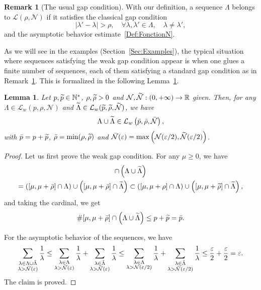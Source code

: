 \documentclass[10pt]{amsart}
\newtheorem{lemm}[theo]{Lemma}\newtheorem{prop}[theo]{Proposition}\newtheorem{coro}[theo]{Corollary}\newtheorem{conj}[theo]{Conjecture}
\theoremstyle{definition}\newtheorem{defi}[theo]{Definition}\newtheorem{rema}[theo]{Remark}\newtheorem{exam}[theo]{Example}\newtheorem{exem}[theo]{Example}\newtheorem{nota}[theo]{Notation}
\newcommand{\LL}{\mathcal{L}}
\newcommand{\NN}{\mathcal{N}}
\newcommand{\N}{\mathbb{N}}
\newcommand{\R}{\mathbb{R}}
\let\oldtilde\tilde
\renewcommand*{\tilde}[1]{\mathchoice{\widetilde{#1}}{\widetilde{#1}}{\oldtilde{#1}}{\oldtilde{#1}}}\let\oldexists\exists
\renewcommand*{\exists}{\mathrel{\oldexists}}
\let\oldforall\forall
\renewcommand*{\forall}{\mathrel{\oldforall}}
\begin{document}
\begin{rema}[The usual gap condition]\label{Rem:usual_gap}
With our definition, a sequence $\Lambda$ belongs to $\LL(\rho,\NN)$ if it satisfies the classical gap condition
\begin{equation}\label{FattoriniRussell_Gap}
|\lambda' - \lambda| > \rho, \quad \forall \lambda,\lambda'\in \Lambda, \quad \lambda\neq \lambda',
\end{equation}
and the asymptotic behavior estimate~\eqref{Def:FonctionN}.
\end{rema}

As we will see in the examples (Section~\ref{Sec:Examples}), the typical situation where sequences satisfying the weak gap condition appear is when one glues a finite number of sequences, each of them satisfying a standard gap condition as in Remark~\ref{Rem:usual_gap}. This is formalized in the following Lemma~\ref{Lem:Stabilite_Lw_Union}.


\begin{lemm}\label{Lem:Stabilite_Lw_Union}
Let $p,\tilde{p} \in \N^*$, $\rho,\tilde{\rho} > 0$ and $\NN,\tilde{\NN} : (0,+\infty) \to \R$ given. Then, for any $\Lambda\in \LL_w(p, \rho, \NN)$ and $\tilde{\Lambda}\in \LL_w(\tilde{p}, \tilde{\rho}, \tilde{\NN})$, we have
\[
\Lambda \cup \tilde{\Lambda} \in \LL_w\left(\bar{p}, \bar{\rho}, \bar{\NN}\right),
\]
with $\bar{p}=p+\tilde{p}$, $\bar{\rho}=\min(\rho,\tilde{\rho})$ and $\bar{\NN}(\varepsilon) = \max \left(\NN(\varepsilon/2),\tilde{\NN}(\varepsilon/2)\right)$.
\end{lemm}

\begin{proof}
Let us first prove the weak gap condition. For any $\mu\geq 0$, we have
\begin{multline*}
[\mu,\mu+\bar{\rho}] \cap \left(\Lambda\cup \tilde{\Lambda}\right)\\ = \left([\mu,\mu+\bar{\rho}] \cap \Lambda \right) \cup \left([\mu,\mu+\bar{\rho}]\cap \tilde{\Lambda}\right)
\subset \left([\mu,\mu+\rho] \cap \Lambda \right) \cup \left([\mu,\mu+\tilde{\rho}]\cap \tilde{\Lambda}\right),
\end{multline*}
and taking the cardinal, we get
\[
\# [\mu,\mu+\bar{\rho}] \cap \left(\Lambda\cup \tilde{\Lambda}\right) \leq p + \tilde{p}=\bar{p}.
\]

For the asymptotic behavior of the sequences, we have
\[
\sum_{\substack{\lambda \in \Lambda\cup \tilde{\Lambda} \\ \lambda>\bar{\NN}(\varepsilon)}} \frac{1}{\lambda}
\leq \sum_{\substack{\lambda \in \Lambda \\ \lambda>\bar{\NN}(\varepsilon)}} \frac{1}{\lambda} + \sum_{\substack{\lambda \in \tilde{\Lambda} \\ \lambda>\bar{\NN}(\varepsilon)}} \frac{1}{\lambda}
\leq \sum_{\substack{\lambda \in \Lambda \\ \lambda>{\NN}(\varepsilon/2)}} \frac{1}{\lambda} + \sum_{\substack{\lambda \in \tilde{\Lambda} \\ \lambda>\tilde{\NN}(\varepsilon/2)}} \frac{1}{\lambda}
\leq \frac{\varepsilon}{2} + \frac{\varepsilon}{2} = \varepsilon.
\]
The claim is proved.
\end{proof}
\end{document}
